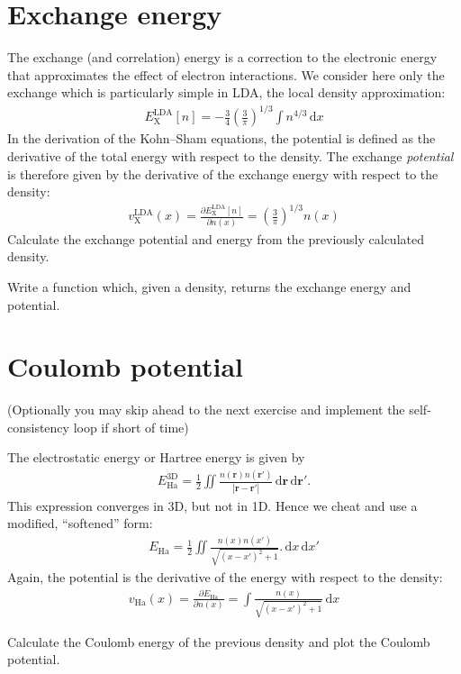 \documentclass{article}
\newcommand{\dee}[0]{\mathrm d}
\newcommand{\idee}[0]{\,\dee}
\newcommand{\pdiff}[2]{\frac{\partial #1}{\partial #2}}
\newcommand{\X}[0]{\mathrm{X}}
\newcommand{\LDA}[0]{\mathrm{LDA}}
\begin{document}
\section{Exchange energy}
The exchange (and correlation) energy is a correction to the
electronic energy that approximates the effect of electron interactions.
We consider here only the exchange which is particularly simple in LDA,
the local density approximation:
\begin{align}
  E_\X^\LDA[n] = -\frac 34 \left(\frac 3 \pi\right)^{1/3} \int n^{4/3} \idee x
\end{align}
In the derivation of the Kohn--Sham equations, the potential is defined
as the derivative of the total energy with respect to the density.
The exchange \emph{potential} is therefore given by the derivative
of the exchange energy with respect to the density:
\begin{align}
  v_{\X}^\LDA(x) = \pdiff{E_\X^\LDA[n]}{n(x)} = \left(\frac3 \pi\right)^{1/3}
  n(x)
\end{align}
Calculate the exchange potential and energy from the previously
calculated density.

Write a function which, given a density, returns the exchange energy and potential.


\section{Coulomb potential}
(Optionally you may skip ahead to the next exercise and implement the
self-consistency loop if short of time)

The electrostatic energy or Hartree energy is given by
\begin{align}
  E_{\mathrm{Ha}}^{\mathrm{3D}} = \frac12 \iint \frac{n(\mathbf r)n(\mathbf r')}{|\mathbf r - \mathbf r'|}\idee \mathbf r \idee \mathbf r'.
\end{align}
This expression converges in 3D, but not in 1D.  Hence we cheat and use
a modified, ``softened'' form:
\begin{align}
E_{\mathrm{Ha}} = \frac12 \iint \frac{n(x) n(x')}{\sqrt{(x - x')^2 + 1}}.
\idee x \idee x'
\end{align}
Again, the potential is the derivative of the energy with respect to the
density:
\begin{align}
  v_{\mathrm{Ha}}(x) = \pdiff{E_{\mathrm{Ha}}}{n(x)} =
  \int \frac{n(x)}{\sqrt{(x - x')^2 + 1}} \idee x
\end{align}

Calculate the Coulomb energy of the previous density and plot the
Coulomb potential.
\end{document}
